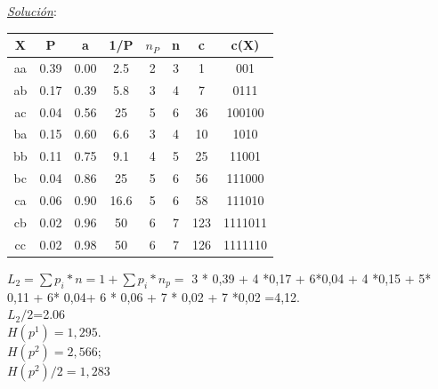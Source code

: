 \documentclass{beamer}
\theoremstyle{plain}
\theoremstyle{example}
\theoremstyle{example}
\begin{document}
\begin{frame}  \footnotesize

\textit{\underline{Solución}}:\\ 

\begin{center}
 \begin{tabular}{ c c c c c c c c}
    X     &  P     &   a    & 1/P & $n_P$ & n & c   & c(X)\\\hline\hline
   aa    & 0.39 & 0.00 & 2.5    & 2      & 3 & 1    & 001\\\hline
   ab    & 0.17 & 0.39 & 5.8    & 3		& 4 & 7    & 0111\\\hline
   ac    & 0.04 & 0.56 & 25     & 5		& 6 & 36  & 100100 \\\hline
   ba    & 0.15 & 0.60 & 6.6    & 3      & 4 & 10  & 1010\\\hline
   bb    & 0.11 & 0.75 & 9.1    & 4      & 5 & 25  & 11001\\\hline
   bc    & 0.04 & 0.86 & 25     & 5      & 6 & 56  & 111000 \\\hline
   ca    & 0.06 & 0.90 & 16.6  & 5      & 6 & 58    & 111010\\\hline
   cb    & 0.02 & 0.96 & 50     & 6      & 7 & 123  & 1111011\\\hline
   cc    & 0.02 & 0.98 & 50     & 6      & 7 & 126  & 1111110 \\\hline
   
 \end{tabular}
\end{center}

\vspace{0.5cm}
$L_2= \sum p_i * n = 1+ \sum p_i * n_p =$ 3 * 0,39 + 4 *0,17 + 6*0,04 + 4 *0,15 + 5* 0,11 + 6* 0,04+ 6 * 0,06 + 7 * 0,02 + 7 *0,02 =4,12. \\

$L_2/2$=2.06\\

$H(p^1)= 1,295$. \\
$H(p^2)= 2,566$;  \\
$H(p^2)/2 = 1,283$\\

\end{frame} 
\end{document}

